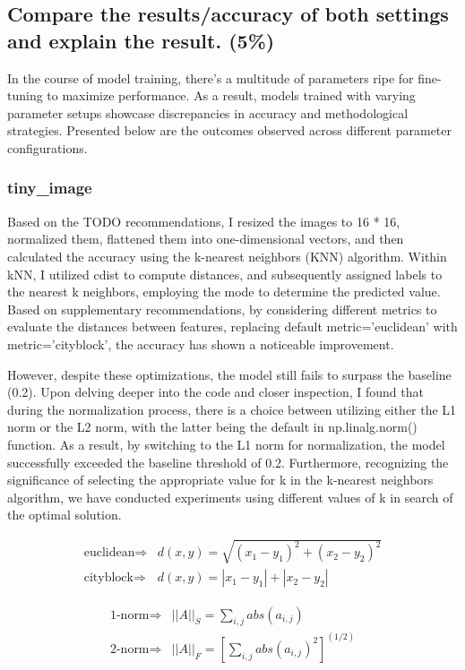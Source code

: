 \documentclass[a4paper, 12pt]{article}
\begin{document}
\subsection{Compare the results/accuracy of both settings and explain the result. (5\%)}
In the course of model training, there's a multitude of parameters ripe for fine-tuning to maximize performance. As a result, models trained with varying parameter setups showcase discrepancies in accuracy and methodological strategies. Presented below are the outcomes observed across different parameter configurations.

\subsubsection{tiny\_image}
Based on the TODO recommendations, I resized the images to 16 * 16, normalized them, flattened them into one-dimensional vectors, and then calculated the accuracy using the k-nearest neighbors (KNN) algorithm. Within kNN, I utilized cdist to compute distances, and subsequently assigned labels to the nearest k neighbors, employing the mode to determine the predicted value. Based on supplementary recommendations, by considering different metrics to evaluate the distances between features, replacing default metric='euclidean' with metric='cityblock', the accuracy has shown a noticeable improvement.

However, despite these optimizations, the model still fails to surpass the baseline (0.2). Upon delving deeper into the code and closer inspection,  I found that during the normalization process, there is a choice between utilizing either the L1 norm or the L2 norm, with the latter being the default in np.linalg.norm() function. As a result, by switching to the L1 norm for normalization, the model successfully exceeded the baseline threshold of 0.2. Furthermore, recognizing the significance of selecting the appropriate value for k in the k-nearest neighbors algorithm, we have conducted experiments using different values of k in search of the optimal solution.

\vspace{2em}

\begin{align*}
  \text{euclidean}\Rightarrow & d(x,y)=\sqrt{(x_1-y_1)^2+(x_2-y_2)^2} \\
  \text{cityblock}\Rightarrow & d(x,y)=|x_1-y_1|+|x_2-y_2|
\end{align*}

\begin{align*}
  \text{1-norm}\Rightarrow & ||A||_S = \sum_{i,j}abs(a_{i,j})                        \\
  \text{2-norm}\Rightarrow & ||A||_F = \left[\sum_{i,j}abs(a_{i,j})^2\right]^{(1/2)}
\end{align*}
\end{document}
